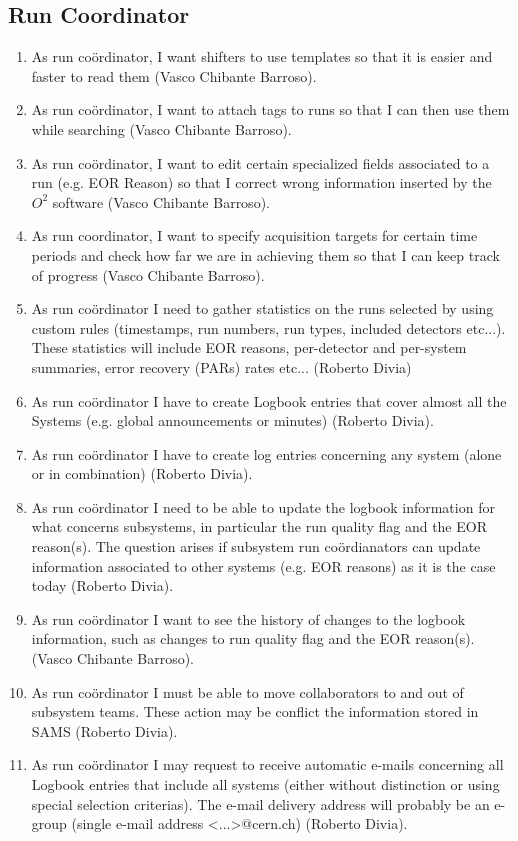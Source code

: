 \subsection{Run Coordinator}
\begin{enumerate}
  \item As run co\"ordinator, I want shifters to use templates so that it is easier and faster to read them (Vasco Chibante Barroso). 
  \item As run co\"ordinator, I want to attach tags to runs so that I can then use them while searching (Vasco Chibante Barroso). 
  \item As run co\"ordinator, I want to edit certain specialized fields associated to a run (e.g. EOR Reason) so that I correct wrong information inserted by the $O^2$ software (Vasco Chibante Barroso). 
  \item As run coordinator, I want to specify acquisition targets for certain time periods and check how far we are in achieving them so that I can keep track of progress (Vasco Chibante Barroso). 
  \item As run co\"ordinator I need to gather statistics on the runs selected by using custom rules (timestamps, run numbers, run types, included detectors etc...). These statistics will include EOR reasons, per-detector and per-system summaries, error recovery (PARs) rates etc... (Roberto Divia)
  \item As run co\"ordinator I have to create Logbook entries that cover almost all the Systems (e.g. global announcements or minutes) (Roberto Divia).
  \item As run co\"ordinator I have to create log entries concerning any system (alone or in combination) (Roberto Divia).
  \item As run co\"ordinator I need to be able to update the logbook information for what concerns subsystems, in particular the run quality flag and the EOR reason(s). The question arises if subsystem run co\"ordianators can update information associated to other systems (e.g. EOR reasons) as it is the case today (Roberto Divia).
  \item As run co\"ordinator I want to see the history of changes to the logbook information, such as changes to run quality flag and the EOR reason(s). (Vasco Chibante Barroso).
  \item As run co\"ordinator I must be able to move collaborators to and out of subsystem teams. These action may be conflict the information stored in SAMS (Roberto Divia).
  \item As run co\"ordinator I may request to receive automatic e-mails concerning all Logbook entries that include all systems (either without distinction or using special selection criterias). The e-mail delivery address will probably be an e-group (single e-mail address <...>@cern.ch) (Roberto Divia).

\end{enumerate}
